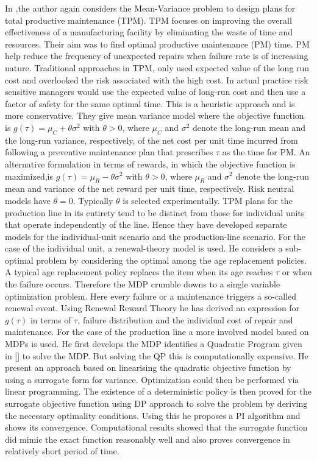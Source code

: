 \documentclass[11pt,a4paper,oneside]{report}
\begin{document}
In \cite{gosavi2006risk},the author again considers the Mean-Variance problem to design plans for total productive maintenance (TPM). TPM  focuses on improving the overall effectiveness of a manufacturing facility by eliminating the waste of time and resources. Their aim was to find optimal productive maintenance (PM) time. PM help reduce the frequency of unexpected repairs when failure rate is of increasing nature. Traditional approaches in TPM, only used expected value of the long run cost and overlooked the risk associated with the high cost. In actual practice risk sensitive managers would use the expected value of long-run cost and then use a factor of safety for the same optimal time. This is a heuristic approach and is more conservative. They give mean variance model where the objective function is $g(\tau)= \mu_C+ \theta {\sigma}^2$ with $\theta>0$, where $\mu_C$ and $\sigma^2$ denote the long-run mean and the long-run variance, respectively, of the net cost per unit time incurred from following a preventive maintenance plan that prescribes $\tau$ as the time for PM. An alternative formulation in terms of rewards, in which the objective function is maximized,is $g(\tau)= \mu_R- \theta {\sigma}^2$ with $\theta>0$, where $\mu_R$ and $\sigma^2$ denote the long-run mean and variance of the net reward per unit time, respectively. Risk neutral models have $\theta =0$. Typically $\theta$ is selected experimentally. TPM plans for the production line in its entirety tend to be distinct from those for individual units that operate independently of the line. Hence they have developed separate models for the individual-unit scenario and the production-line scenario. For the case of the individual unit, a renewal-theory model is used. He considers a sub-optimal problem by considering the optimal among the age replacement policies. A typical age replacement policy replaces the item when its age reaches $\tau$ or when the failure occurs. Therefore the MDP crumble downs to a single variable optimization problem. Here every failure or a maintenance triggers a so-called renewal event. Using Renewal Reward Theory he has derived an expression for $g(\tau)$ in terms of $\tau$, failure distribution and the individual cost of repair and maintenance. For the case of the production line a more involved model based on MDPs is used. He first develops the MDP identifies a Quadratic Program given in [] to solve the MDP. But solving the QP this is computationally expensive. He present an approach based on linearising the quadratic objective function by using a surrogate form for variance. Optimization could then be performed via linear programming. The existence of a deterministic policy is then proved for the surrogate objective function using DP approach to solve the problem by deriving the necessary optimality conditions. Using this he proposes a PI algorithm and shows its convergence. Computational results showed that the surrogate function did mimic the exact function reasonably well and also proves convergence in relatively short period of time.\\
\end{document}
